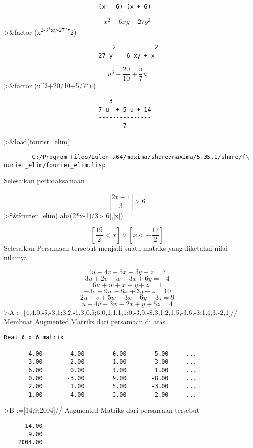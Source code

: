 \documentclass[
]{book}
\begin{document}
\begin{verbatim}
                           (x - 6) (x + 6)
\end{verbatim}

\[x^2-6xy-27y^2\]\textgreater\&factor (x\textsuperscript{2-6*xy-27*y}2)

\begin{verbatim}
                               2           2
                         - 27 y  - 6 xy + x
\end{verbatim}

\[u^3 - \frac{20}{10} + \frac{5}{7} u\]\textgreater\&factor (u\^{}3+20/10+5/7*u)

\begin{verbatim}
                              3
                           7 u  + 5 u + 14
                           ---------------
                                  7
\end{verbatim}

\textgreater\&load(fourier\_elim)

\begin{verbatim}
        C:/Program Files/Euler x64/maxima/share/maxima/5.35.1/share/f\
ourier_elim/fourier_elim.lisp
\end{verbatim}

Selesaikan pertidaksamaan

\[\left|\frac{2x-1}{3}\right| > 6\]\textgreater\$\&fourier\_elim({[}abs(2*x-1)/3\textgreater{} 6{]},{[}x{]})

\[\left[ \frac{19}{2}<x \right] \lor \left[ x<-\frac{17}{2} \right]\]Selesaikan Persamaan tersebut menjadi suatu matriks yang diketahui nilai-nilainya.

\[4u+4v-5x-3y+z=7\] \[3u+2v-w+3x+6y=-4\] \[6u+w+x+y+z=1\] \[-3v+9w-8x+3y-z=10\] \[2u+v+5w-3x+6y-3z=9\] \[u+4v+3w-2x+y+5z=4\]\textgreater A :={[}4,4,0,-5,-3,1;3,2,-1,3,0,6;6,0,1,1,1,1;0,-3,9,-8,3,1;2,1,5,-3,6,-3;1,4,3,-2,1{]}// Membuat Augmented Matriks dari persamaan di atas

\begin{verbatim}
Real 6 x 6 matrix

       4.00        4.00        0.00       -5.00     ...
       3.00        2.00       -1.00        3.00     ...
       6.00        0.00        1.00        1.00     ...
       0.00       -3.00        9.00       -8.00     ...
       2.00        1.00        5.00       -3.00     ...
       1.00        4.00        3.00       -2.00     ...
\end{verbatim}

\textgreater B :={[}14;9;2004{]}// Augmented Matriks dari persamaan tersebut

\begin{verbatim}
      14.00 
       9.00 
    2004.00 
\end{verbatim}

\backmatter
\end{document}
